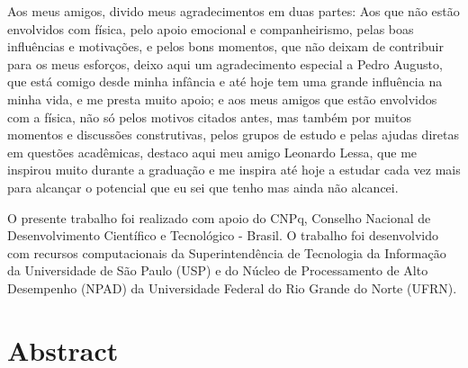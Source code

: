 \documentclass[openany,a4paper,12pt,oneside]{book}
\begin{document}
\begin{spacing}{1.5}
Aos meus amigos, divido meus agradecimentos em duas partes: Aos que não estão envolvidos com física, pelo apoio emocional e companheirismo, pelas boas influências e motivações, e pelos bons momentos, que não deixam de contribuir para os meus esforços, deixo aqui um agradecimento especial a Pedro Augusto, que está comigo desde minha infância e até hoje tem uma grande influência na minha vida, e me presta muito apoio; e aos meus amigos que estão envolvidos com a física, não só pelos motivos citados antes, mas também por muitos momentos e discussões construtivas, pelos grupos de estudo e pelas ajudas diretas em questões acadêmicas, destaco aqui meu amigo Leonardo Lessa, que me inspirou muito durante a graduação e me inspira até hoje a estudar cada vez mais para alcançar o potencial que eu sei que tenho mas ainda não alcancei.

O presente trabalho foi realizado com apoio do CNPq, Conselho Nacional de Desenvolvimento Científico e Tecnológico - Brasil. O trabalho foi desenvolvido com recursos computacionais da Superintendência de Tecnologia da Informação da Universidade de São Paulo (USP) e do Núcleo de Processamento de Alto Desempenho (NPAD) da Universidade Federal do Rio Grande do Norte (UFRN).

\end{spacing}
\endgroup

\chapter*{Abstract}
\end{document}
